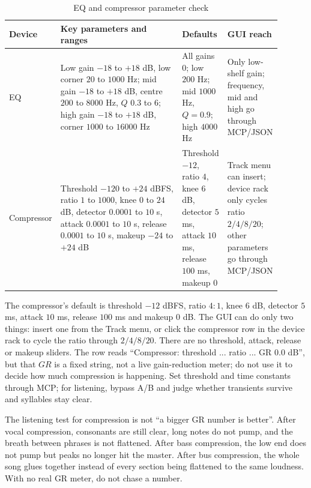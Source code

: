 
\begin{table}[htbp]
\centering
\small
\begin{tabular}{@{}p{0.12\linewidth}p{0.46\linewidth}p{0.15\linewidth}p{0.17\linewidth}@{}}
\hline
Device & Key parameters and ranges & Defaults & GUI reach \\
\hline
EQ & Low gain $-18$ to $+18$ dB, low corner $20$ to $1000$ Hz; mid gain $-18$ to $+18$ dB, centre $200$ to $8000$ Hz, $Q$ $0.3$ to $6$; high gain $-18$ to $+18$ dB, corner $1000$ to $16000$ Hz & All gains $0$; low $200$ Hz; mid $1000$ Hz, $Q=0.9$; high $4000$ Hz & Only low-shelf gain; frequency, mid and high go through MCP/JSON \\
Compressor & Threshold $-120$ to $+24$ dBFS, ratio $1$ to $1000$, knee $0$ to $24$ dB, detector $0.0001$ to $10$ s, attack $0.0001$ to $10$ s, release $0.0001$ to $10$ s, makeup $-24$ to $+24$ dB & Threshold $-12$, ratio $4$, knee $6$ dB, detector $5$ ms, attack $10$ ms, release $100$ ms, makeup $0$ & Track menu can insert; device rack only cycles ratio $2/4/8/20$; other parameters go through MCP/JSON \\
\hline
\end{tabular}
\caption{EQ and compressor parameter check}
\label{tab:walk-eq-comp}
\end{table}

The compressor's default is threshold $-12$ dBFS, ratio $4:1$, knee $6$ dB, detector $5$ ms, attack $10$ ms, release $100$ ms and makeup $0$ dB. The GUI can do only two things: insert one from the Track menu, or click the compressor row in the device rack to cycle the ratio through $2/4/8/20$. There are no threshold, attack, release or makeup sliders. The row reads ``Compressor: threshold ... ratio ... GR 0.0 dB'', but that $GR$ is a fixed string, not a live gain-reduction meter; do not use it to decide how much compression is happening. Set threshold and time constants through MCP; for listening, bypass A/B and judge whether transients survive and syllables stay clear.

The listening test for compression is not ``a bigger GR number is better''. After vocal compression, consonants are still clear, long notes do not pump, and the breath between phrases is not flattened. After bass compression, the low end does not pump but peaks no longer hit the master. After bus compression, the whole song glues together instead of every section being flattened to the same loudness. With no real GR meter, do not chase a number.

